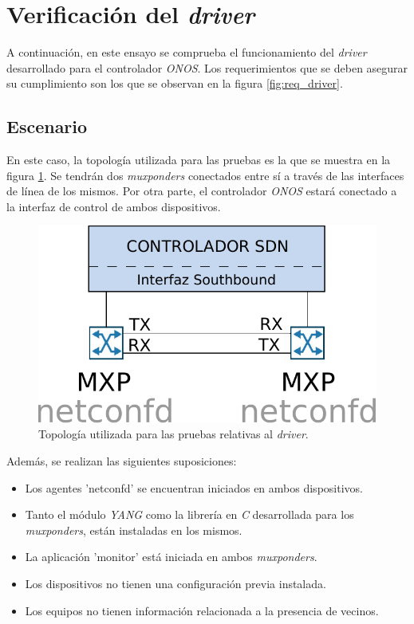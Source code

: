 
\section{Verificación del \textit{driver}}

A continuación, en este ensayo se comprueba el funcionamiento del \textit{driver} desarrollado para el controlador \textit{ONOS}. Los requerimientos que se deben asegurar su cumplimiento son los que se observan en la figura \ref{fig:req_driver}. 

\subsection{Escenario}

En este caso, la topología utilizada para las pruebas es la que se muestra en la figura \ref{fig:test_topo_driver}. Se tendrán dos \textit{muxponders} conectados entre sí a través de las interfaces de línea de los mismos. Por otra parte, el controlador \textit{ONOS} estará conectado a la interfaz de control de ambos dispositivos. 


\begin{figure}[!h]
	\centering
	\includegraphics[scale=0.8]{Figures/topologiatestdriver.pdf}
	\caption{Topología utilizada para las pruebas relativas al \textit{driver}.}
	\label{fig:test_topo_driver}
  \end{figure}


  Además, se realizan las siguientes suposiciones:

\begin{itemize}
	\item Los agentes 'netconfd' se encuentran iniciados en ambos dispositivos.
    \item Tanto el módulo \textit{YANG} como la librería en \textit{C} desarrollada para los \textit{muxponders}, están instaladas en los mismos.
    \item La aplicación 'monitor' está iniciada en ambos \textit{muxponders}.
    \item Los dispositivos no tienen una configuración previa instalada. 
    \item Los equipos no tienen información relacionada a la presencia de vecinos.
\end{itemize}

